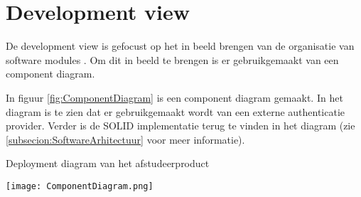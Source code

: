 \section{Development view}
De development view is gefocust op het in beeld brengen van de organisatie van software modules \parencite{4p1Model}.
Om dit in beeld te brengen is er gebruikgemaakt van een component diagram.

\whitespace
In figuur \ref{fig:ComponentDiagram} is een component diagram gemaakt.
In het diagram is te zien dat er gebruikgemaakt wordt van een externe authenticatie provider.
Verder is de SOLID implementatie terug te vinden in het diagram (zie \ref{subsecion:SoftwareArhitectuur} voor meer informatie). 

\whitespace[2]
\begin{graphic}
    \captionsetup{type=figure}
    \caption{Deployment diagram van het afstudeerproduct}
    \texttt{[image: ComponentDiagram.png]}
    \label{fig:ComponentDiagram}
\end{graphic}
